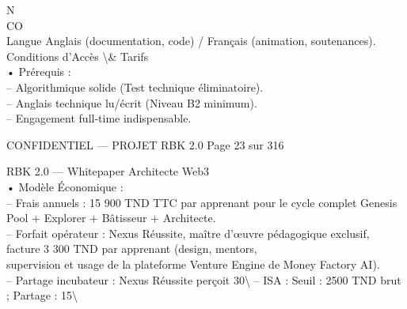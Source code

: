 N\\
CO\\
Langue                      Anglais (documentation, code) / Français (animation, soutenances).\\
\vspace{0.5em}
\vspace{0.5em}
\vspace{0.5em}
Conditions d’Accès \textbackslash{}& Tarifs\\
• Prérequis :\\
\vspace{0.5em}
– Algorithmique solide (Test technique éliminatoire).\\
– Anglais technique lu/écrit (Niveau B2 minimum).\\
– Engagement full-time indispensable.\\
\vspace{0.5em}
\vspace{0.5em}
\begin{confidential}CONFIDENTIEL — PROJET RBK 2.0                                 Page 23 sur 316\end{confidential}
RBK 2.0 — Whitepaper Architecte Web3\\
\vspace{0.5em}
\vspace{0.5em}
• Modèle Économique :\\
\vspace{0.5em}
– Frais annuels : 15 900 TND TTC par apprenant pour le cycle complet Genesis Pool + Explorer + Bâtisseur + Architecte.\\
\vspace{0.5em}
\vspace{0.5em}
– Forfait opérateur : Nexus Réussite, maître d’œuvre pédagogique exclusif, facture 3 300 TND par apprenant (design, mentors,\\
supervision et usage de la plateforme Venture Engine de Money Factory AI).\\
\vspace{0.5em}
\vspace{0.5em}
– Partage incubateur : Nexus Réussite perçoit 30\textbackslash{}%
\vspace{0.5em}
\vspace{0.5em}
– ISA : Seuil : 2500 TND brut ; Partage : 15\textbackslash{}%
